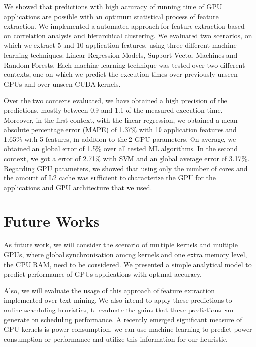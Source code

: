 We showed that predictions with high accuracy of running time of GPU applications are possible with an optimum statistical process of feature extraction. We implemented a automated approach for feature extraction based on correlation analysis and hierarchical clustering. We evaluated two scenarios, on which we extract 5 and 10 application features, using three different machine learning techniques: Linear Regression Models, Support Vector Machines and Random Forests. Each machine learning technique was tested over two different contexts, one on which we predict the execution times over previously unseen GPUs and over unseen CUDA kernels. 

Over the two contexts evaluated, we have obtained a high precision of the predictions, mostly between 0.9 and 1.1 of the measured execution time. Moreover, in the first context, with the linear regression, we obtained a mean absolute percentage error (MAPE) of 1.37\% with 10 application features and 1.65\% with 5 features, in addition to the 2 GPU parameters. On average, we obtained an global error of 1.5\% over all tested ML algorithms. In the second context, we got a error of 2.71\% with SVM and an global average error of 3.17\%. Regarding GPU parameters, we showed that using only the number of cores and the amount of L2 cache was sufficient to characterize the GPU for the applications and GPU architecture that we used.



\section{Future Works} 
As future work, we will consider the scenario of multiple kernels and multiple GPUs, where global synchronization among kernels and one extra memory level, the CPU RAM, need to be considered. We presented a simple analytical model to predict performance of GPUs applications with optimal accuracy. 


Also, we will evaluate the usage of this approach of feature extraction implemented over text mining. We also intend to apply these predictions to online scheduling heuristics, to evaluate the gains that these predictions can generate on scheduling performance. A recently emerged significant measure of GPU kernels is power consumption, we can use machine learning to predict power consumption or performance and utilize this information for our heuristic.

